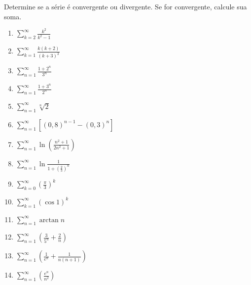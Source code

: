 \item\label{5}
Determine se a série é convergente ou divergente. Se for convergente, calcule sua soma.

\begin{multicols}{2}
    \begin{enumerate}
        \item $\displaystyle \sum_{k=2}^{\infty} \frac{k^2}{k^2 - 1}$
        \item $\displaystyle \sum_{k=1}^{\infty} \frac{k(k+2)}{(k+3)^2}$
        \item $\displaystyle \sum_{n=1}^{\infty} \frac{1 + 2^n}{3^n}$
        \item $\displaystyle \sum_{n=1}^{\infty} \frac{1 + 3^n}{2^n}$
        \item $\displaystyle \sum_{n=1}^{\infty} \sqrt[n]{2}$
        \item $\displaystyle \sum_{n=1}^{\infty} \left[ (0,8)^{n-1} - (0,3)^n \right]$
        \item $\displaystyle \sum_{n=1}^{\infty} \ln \left( \frac{n^2 + 1}{2n^2 + 1}\right)$
        \item $\displaystyle \sum_{n=1}^{\infty} \ln \frac{1}{1 + (\frac{2}{3})^n}$
        \item $\displaystyle \sum_{k=0}^{\infty} \left( \frac{\pi}{3}\right)^k$
        \item $\displaystyle \sum_{k=1}^{\infty} \left( \cos{1}\right)^k$
        \item $\displaystyle \sum_{n=1}^{\infty} \arctan{n}$
        \item $\displaystyle \sum_{n=1}^{\infty} \left( \frac{3}{5^n} + \frac{2}{n}\right)$
        \item $\displaystyle \sum_{n=1}^{\infty} \left( \frac{1}{e^n} + \frac{1}{n(n+1)}\right)$
        \item $\displaystyle \sum_{n=1}^{\infty} \left( \frac{e^n}{n^2}\right)$
    \end{enumerate}
\end{multicols}
